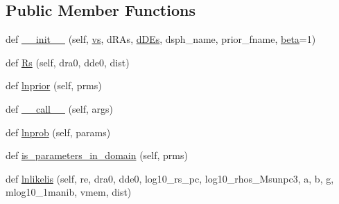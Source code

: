 \subsection*{Public Member Functions}
\begin{DoxyCompactItemize}
\item 
def \hyperlink{class__modKI17_1_1modKI17__memonly_a55fde9391aab82b0622165fe6c31b5e9}{\+\_\+\+\_\+init\+\_\+\+\_\+} (self, \hyperlink{class__modKI17_1_1modKI17__memonly_a6a6b262ec1d69137a3f087bbcff279d1}{vs}, d\+R\+As, \hyperlink{class__modKI17_1_1modKI17__memonly_a66eadff7c0eba4fe2b238e5aedf98638}{d\+D\+Es}, dsph\+\_\+name, prior\+\_\+fname, \hyperlink{class__modKI17_1_1modKI17__memonly_ab9834e8fbb5fba20c559bc2e42ef15b4}{beta}=1)
\item 
def \hyperlink{class__modKI17_1_1modKI17__memonly_a335fdfaf1863a33e9d52cfc5d299b6dc}{Rs} (self, dra0, dde0, dist)
\item 
def \hyperlink{class__modKI17_1_1modKI17__memonly_a81432d4c6b99b0325dec864f96d55129}{lnprior} (self, prms)
\item 
def \hyperlink{class__modKI17_1_1modKI17__memonly_a71d2532d1eaf5b5da0ba44fbaa4c7da5}{\+\_\+\+\_\+call\+\_\+\+\_\+} (self, args)
\item 
def \hyperlink{class__modKI17_1_1modKI17__memonly_a76cb36f7f23a5dd7f537f9769bd75a4e}{lnprob} (self, params)
\item 
def \hyperlink{class__modKI17_1_1modKI17__memonly_a7e4159dc246bb2ff5aa958aab45e40d8}{is\+\_\+parameters\+\_\+in\+\_\+domain} (self, prms)
\item 
def \hyperlink{class__modKI17_1_1modKI17__memonly_a15f3ae6794705cadd3f9a57b954c1fc2}{lnlikelis} (self, re, dra0, dde0, log10\+\_\+rs\+\_\+pc, log10\+\_\+rhos\+\_\+\+Msunpc3, a, b, g, mlog10\+\_\+1manib, vmem, dist)
\end{DoxyCompactItemize}
